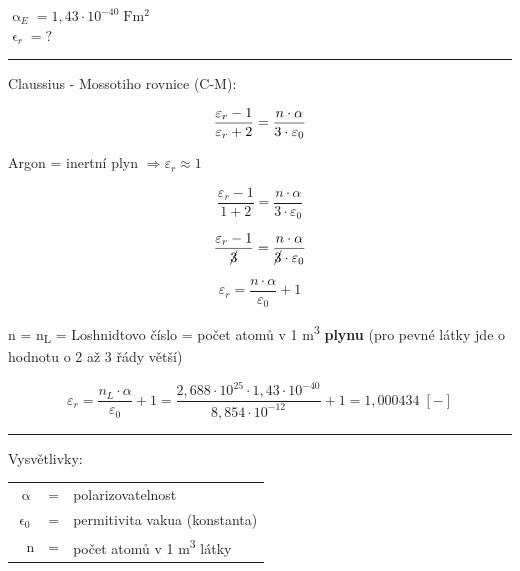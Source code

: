 
$\upalpha_E = 1,43 \cdot 10^{-40} \; \si{\farad\meter\squared}$\\
$\upvarepsilon_r = ?$ \\
\noindent\rule{8cm}{0.4pt}

Claussius - Mossotiho rovnice (C-M):

\begin{equation*}
    \frac{\varepsilon_r - 1}{\varepsilon_r + 2} = \frac{n \cdot \alpha}{3 \cdot \varepsilon_0} \\
\end{equation*}

Argon = inertní plyn $\Rightarrow  \varepsilon_r \approx 1$

\begin{equation*}
    \frac{\varepsilon_r - 1}{1 + 2} = \frac{n \cdot \alpha}{3 \cdot \varepsilon_0}
\end{equation*}

\begin{equation*}
    \frac{\varepsilon_r - 1}{\cancel{3}} = \frac{n \cdot \alpha}{\cancel{3} \cdot \varepsilon_0}
\end{equation*}

\begin{equation*}
    \varepsilon_r= \frac{n \cdot \alpha}{\varepsilon_0} + 1
\end{equation*}

n = n\textsubscript{L} = Loshnidtovo číslo = počet atomů v 1 \si{\cubic\meter} \textbf{plynu} (pro pevné látky jde o hodnotu o 2 až 3 řády větší)

\begin{equation*}
    \varepsilon_r = \frac{n_L \cdot \alpha}{\varepsilon_0} + 1 = \frac{2,688 \cdot 10^{25} \cdot 1,43 \cdot 10^{-40}}{8,854 \cdot 10^{-12}} + 1 = 1,000434 \; [-]
\end{equation*}

\noindent\rule{8cm}{0.4pt}

Vysvětlivky:

\begin{tabular}{rcl}
    $\upalpha$ & = & polarizovatelnost \\
    $\upvarepsilon_0$ & = & permitivita vakua (konstanta) \\
    n & = & počet atomů v 1 \si{\cubic\meter} látky
\end{tabular}

